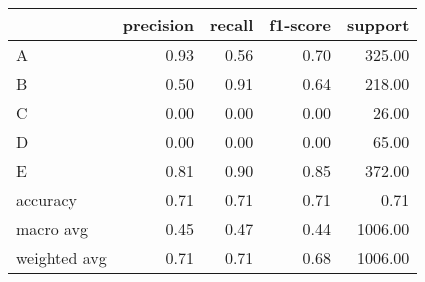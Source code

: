 \begin{tabular}{|l|r|r|r|r|}
\hline
{} &  precision &  recall &  f1-score &  support \\
\hline
A            &       0.93 &    0.56 &      0.70 &   325.00 \\
B            &       0.50 &    0.91 &      0.64 &   218.00 \\
C            &       0.00 &    0.00 &      0.00 &    26.00 \\
D            &       0.00 &    0.00 &      0.00 &    65.00 \\
E            &       0.81 &    0.90 &      0.85 &   372.00 \\
accuracy     &       0.71 &    0.71 &      0.71 &     0.71 \\
macro avg    &       0.45 &    0.47 &      0.44 &  1006.00 \\
weighted avg &       0.71 &    0.71 &      0.68 &  1006.00 \\
\hline
\end{tabular}
